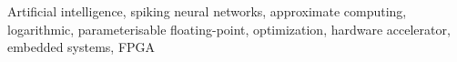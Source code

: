 \begin{keywords}
Artificial intelligence, spiking neural networks, approximate computing, logarithmic, parameterisable floating-point, optimization, hardware accelerator, embedded systems, FPGA
\end{keywords}

\titlepgskip=-15pt

\maketitle
